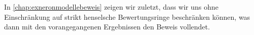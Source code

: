 In \autoref{chap:exneronmodellebeweis} zeigen wir zuletzt, dass wir
uns ohne Einschränkung auf strikt henselsche Bewertungsringe
beschränken können, was dann mit den vorangegangenen Ergebnissen den
Beweis vollendet.



